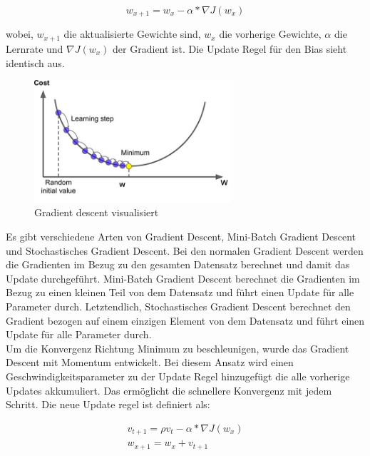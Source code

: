 \begin{equation}
  w_{x+1} = w_x - \alpha * \nabla J(w_x)
\end{equation}

wobei, $w_{x+1}$ die aktualisierte Gewichte sind, $w_x$ die vorherige Gewichte, $ \alpha $ die Lernrate und $\nabla J(w_x)$ der Gradient ist. 
Die Update Regel für den Bias sieht identisch aus.

\begin{figure}[H]
  \centering
  \includegraphics[width=0.65\textwidth]{resources/cnn/gradient-descent.jpg}
  \caption{
    Gradient descent visualisiert
    \cite{gradient-descent}
  }
  \label{image:gradient-descent}
\end{figure}

Es gibt verschiedene Arten von Gradient Descent, Mini-Batch Gradient Descent und Stochastisches Gradient Descent. Bei den normalen Gradient Descent
werden die Gradienten im Bezug zu den gesamten Datensatz berechnet und damit das Update durchgeführt. Mini-Batch Gradient Descent berechnet 
die Gradienten im Bezug zu einen kleinen Teil von dem Datensatz und führt einen Update für alle Parameter durch. Letztendlich, Stochastisches Gradient Descent 
berechnet den Gradient bezogen auf einem einzigen Element von dem Datensatz und führt einen Update für alle Parameter durch.
\\
Um die Konvergenz Richtung Minimum zu beschleunigen, wurde das Gradient Descent mit Momentum entwickelt. Bei diesem Ansatz wird einen 
Geschwindigkeitsparameter zu der Update Regel hinzugefügt die alle vorherige Updates akkumuliert. Das ermöglicht die schnellere Konvergenz mit jedem Schritt.
Die neue Update regel ist definiert als:

\begin{equation}
  \begin{gathered}
    v_{t+1} = \rho v_t - \alpha * \nabla J(w_x) \\
    w_{x+1} = w_x + v_{t+1}
  \end{gathered}
\end{equation}


